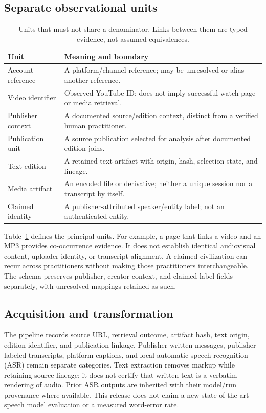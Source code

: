 \subsection{Separate observational units}
\begin{table}[t]
\centering\small
\begin{tabular}{p{}p{}}
\toprule
Unit & Meaning and boundary \\
\midrule
Account reference & A platform/channel reference; may be unresolved or alias another reference. \\
Video identifier & Observed YouTube ID; does not imply successful watch-page or media retrieval. \\
Publisher context & A documented source/edition context, distinct from a verified human practitioner. \\
Publication unit & A source publication selected for analysis after documented edition joins. \\
Text edition & A retained text artifact with origin, hash, selection state, and lineage. \\
Media artifact & An encoded file or derivative; neither a unique session nor a transcript by itself. \\
Claimed identity & A publisher-attributed speaker/entity label; not an authenticated entity. \\
\bottomrule
\end{tabular}
\caption{Units that must not share a denominator. Links between them are typed evidence, not assumed equivalences.}
\label{tab:units}
\end{table}

Table~\ref{tab:units} defines the principal units. For example, a page that links a video and an MP3 provides co-occurrence evidence. It does not establish identical audiovisual content, uploader identity, or transcript alignment. A claimed civilization can recur across practitioners without making those practitioners interchangeable. The schema preserves publisher, creator-context, and claimed-label fields separately, with unresolved mappings retained as such.

\subsection{Acquisition and transformation}
The pipeline records source URL, retrieval outcome, artifact hash, text origin, edition identifier, and publication linkage. Publisher-written messages, publisher-labeled transcripts, platform captions, and local automatic speech recognition (ASR) remain separate categories. Text extraction removes markup while retaining source lineage; it does not certify that written text is a verbatim rendering of audio. Prior ASR outputs are inherited with their model/run provenance where available. This release does not claim a new state-of-the-art speech model evaluation or a measured word-error rate.

